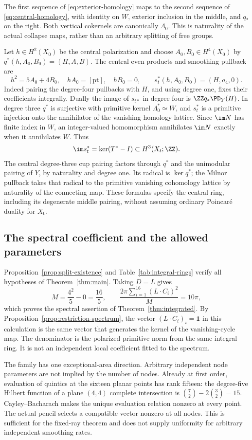 The first sequence of \eqref{eq:exterior-homology} maps to the second
sequence of \eqref{eq:central-homology}, with identity on $W$, exterior
inclusion in the middle, and $q_*$ on the right. Both vertical cokernels
are canonically $\Lambda_0$. This is naturality of the actual collapse maps,
rather than an arbitrary splitting of free groups.

Let $h\in H^2(X_0)$ be the central polarization and choose
$A_0,B_0\in H^4(X_0)$ by $q^*(h,A_0,B_0)=(H,A,B)$.
The central even products and smoothing pullback are
\begin{equation}\label{eq:central-ring}
 h^2=5A_0+4B_0,\quad hA_0=[\mathrm{pt}],\quad hB_0=0,
 \qquad s_t^*(h,A_0,B_0)=(H,a_4,0).
\end{equation}
Indeed pairing the degree-four pullbacks with $H$, and using degree one,
fixes their coefficients integrally. Dually the image of $s_{t*}$ in
degree four is $\ZZ q_*\PD_Y(H)$. In degree three $q^*$ is surjective
with primitive kernel $\Lambda_0^*\simeq W$, and $s_t^*$ is a primitive injection
onto the annihilator of the vanishing homology lattice. Since $\im N$
has finite index in $W$, an integer-valued homomorphism annihilates
$\im N$ exactly when it annihilates $W$. Thus
\[
 \im s_t^*=\ker(T^*-I)\subset H^3(X_t;\ZZ).
\]
The central degree-three cup pairing factors through $q^*$ and the
unimodular pairing of $Y$, by naturality and degree one. Its radical is
$\ker q^*$; the Milnor pullback takes that radical to the primitive
vanishing cohomology lattice by naturality of the connecting map.
These formulas specify the central ring, including its degenerate
middle pairing, without assuming ordinary Poincar\'e duality for $X_0$.

\subsection{The spectral coefficient and the allowed parameters}
Proposition~\ref{prop:split-existence} and Table~\ref{tab:integral-rings}
verify all hypotheses of Theorem~\ref{thm:main}. Taking $D=L$ gives
\[
 M=\frac{4^2}{5}-0=\frac{16}{5},\qquad
 \frac{2\pi\sum_{i=1}^{16}(L\cdot C_i)^2}{M}=10\pi,
\]
which proves the spectral assertion of Theorem~\ref{thm:integrated}.
By Proposition~\ref{prop:restriction-spectrum}, the vector
$(L\cdot C_i)_i=\mathbf1$ in this calculation is the same vector
that generates the kernel of the vanishing-cycle map. The denominator
is the polarized primitive norm from the same integral ring. It is
not an independent local coefficient fitted to the spectrum.

The family has one exceptional-area direction. Arbitrary independent
node parameters are not implied by the number of nodes. Already at
first order, evaluation of quintics at the sixteen planar points has
rank fifteen: the degree-five Hilbert function of a plane $(4,4)$
complete intersection is $\binom72-2\binom32=15$.
Cayley--Bacharach makes the unique evaluation relation nonzero at every
point. The actual pencil selects a compatible vector nonzero at all
nodes. This is sufficient for the fixed-ray theorem and does not
supply uniformity for arbitrary independent smoothing rates.

